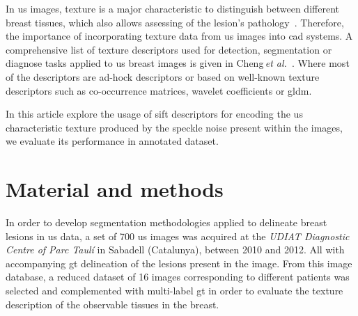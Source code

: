 \documentclass[a4paper, 10pt, conference]{llncs}      %
\begin{document}

In \ac{us} images, texture is a major characteristic to distinguish between different breast tissues, which also allows assessing of the lesion's pathology~\cite{stavros2004breast}.  Therefore, the importance of incorporating texture data from  \ac{us} images into \ac{cad} systems. A comprehensive list of texture descriptors used for detection, segmentation or diagnose tasks applied to \ac{us} breast images is given in Cheng\,\emph{et al.}~\cite{Cheng:2009p10580}. Where most of the descriptors are ad-hock descriptors or based on well-known texture descriptors such as co-occurrence matrices, wavelet coefficients or \ac{gldm}.



In this article explore the usage of \ac{sift} descriptors for encoding the \ac{us} characteristic texture produced by the speckle noise present within the images, we evaluate its performance in annotated dataset.  

\section{Material and methods}
In order to develop segmentation methodologies applied to delineate breast lesions in \ac{us} data, a set of 700 \ac{us} images was acquired at the \emph{UDIAT Diagnostic Centre of Parc Taul\'{i}} in Sabadell (Catalunya), between 2010 and 2012. All with accompanying \ac{gt} delineation of the lesions present in the image. From this image database, a reduced dataset of 16 images corresponding to different patients was selected and complemented with multi-label \ac{gt} in order to evaluate the texture description of the observable tissues in the breast.
\end{document}

